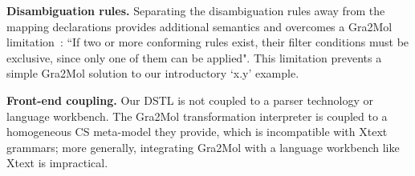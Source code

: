\documentclass{llncs}
\begin{document}

\textbf{Disambiguation rules.} Separating the disambiguation rules away from the mapping declarations provides additional semantics and overcomes a Gra2Mol limitation~\cite{canovas2012gra2mol}: ``If two or more conforming rules exist, their filter conditions must be exclusive, since only one of them can be applied". This limitation prevents a simple Gra2Mol solution to our introductory `x.y' example.

\textbf{Front-end coupling.} Our DSTL is not coupled to a parser technology or language workbench. The Gra2Mol transformation interpreter is coupled to a homogeneous CS meta-model they provide, which is incompatible  with Xtext grammars; more generally, integrating Gra2Mol with a language workbench like Xtext is impractical.


\end{document}
